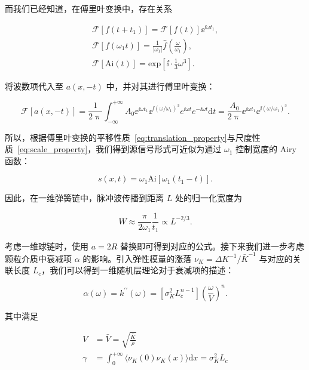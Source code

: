 而我们已经知道，在傅里叶变换中，存在关系

\begin{align}
  \mathcal{F}[f(t+t_{1})] = \mathcal{F}[f(t)]{\ee}^{\ii\omega t_{1}},\label{eq:translation_property}\\
  \mathcal{F}[f(\omega_{1}t)] = \frac{1}{|\omega_{1}|}\hat{f}\left(\frac{\omega}{\omega_{1}}\right),\label{eq:scale_property}\\
  \mathcal{F}[\text{Ai}(t)] = \text{exp}\left[\ii\cdot \frac{1}{3}\omega^3\right].
\end{align}

将波数项代入至 $a(x,-t)$ 中，并对其进行傅里叶变换：

\begin{equation}
  \mathcal{F}[a(x,-t)] = \frac{1}{2\uppi}\int_{-\infty}^{+\infty}A_{0}{\ee}^{\ii\omega t_{1}}{\ee}^{\ii(\omega/\omega_{1})^{3}}e^{\ii\omega t}e^{-\ii\omega t}\mathrm{d}t = \frac{A_{0}}{2\uppi}{\ee}^{\ii\omega t_{1}}{\ee}^{\ii(\omega/\omega_{1})^{3}}.
\end{equation}

所以，根据傅里叶变换的平移性质~\eqref{eq:translation_property}与尺度性质~\eqref{eq:scale_property}，我们得到源信号形式可近似为通过 $\omega_{1}$ 控制宽度的 Airy 函数：

\begin{equation}
  s(x,t) = \omega_{1}\text{Ai}\left[\omega_{1}(t_{1}-t)\right].
\end{equation}

因此，在一维弹簧链中，脉冲波传播到距离 $L$ 处的归一化宽度为

\begin{equation}
  W \approx \frac{\pi}{2\omega_{1}}\frac{1}{t_{1}}\propto L^{-2/3}.
\end{equation}

考虑一维球链时，使用 $a=2R$ 替换即可得到对应的公式\cite{PhysRevE.91.022205}。接下来我们进一步考虑颗粒介质中衰减项 $\alpha$ 的影响。引入弹性模量的涨落 $\nu_{K} = \Delta K^{-1}/\bar{K}^{-1}$ 与对应的关联长度 $L_{c}$，我们可以得到一维随机层理论对于衰减项的描述：

\begin{equation}
  \alpha(\omega) = k^{\prime\prime}(\omega) = [\sigma_{K}^{2}L_{c}^{n-1}]\left(\frac{\omega}{V}\right)^{n}.
\end{equation}

其中满足

\begin{align}
  V &= \bar{V} = \sqrt{\frac{\bar{K}}{\bar{\rho}}}\\
  \gamma &= \int_{0}^{+\infty}\langle\nu_{K}(0)\nu_{K}(x)\rangle\mathrm{d}x = \sigma_{K}^{2}L_{c}
\end{align}

